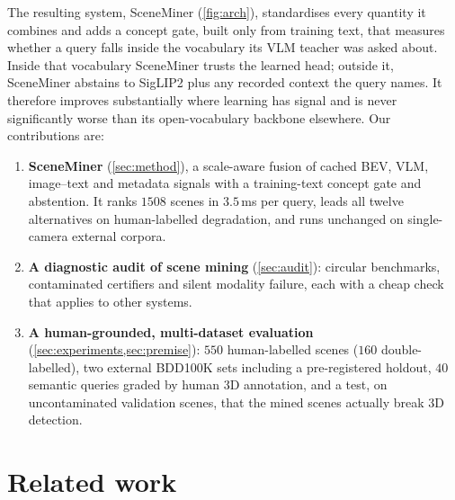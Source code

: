 \documentclass[10pt,twocolumn,letterpaper]{article}
\begin{document}
The resulting system, SceneMiner (\cref{fig:arch}), standardises every quantity it
combines and adds a concept gate, built only from training text, that measures
whether a query falls inside the vocabulary its VLM teacher was asked about. Inside
that vocabulary SceneMiner trusts the learned head; outside it, SceneMiner abstains
to SigLIP2 plus any recorded context the query names. It therefore improves
substantially where learning has signal and is never significantly worse than its
open-vocabulary backbone elsewhere. Our contributions are:
\begin{enumerate}\setlength{\itemsep}{1pt}
\item \textbf{SceneMiner} (\cref{sec:method}), a scale-aware fusion of cached BEV,
  VLM, image--text and metadata signals with a training-text concept gate and
  abstention. It ranks $1508$ scenes in $3.5$\,ms per query, leads all twelve
  alternatives on human-labelled degradation, and runs unchanged on single-camera
  external corpora.
\item \textbf{A diagnostic audit of scene mining} (\cref{sec:audit}): circular
  benchmarks, contaminated certifiers and silent modality failure, each with a
  cheap check that applies to other systems.
\item \textbf{A human-grounded, multi-dataset evaluation}
  (\cref{sec:experiments,sec:premise}): $550$ human-labelled scenes ($160$
  double-labelled), two external BDD100K sets including a pre-registered holdout,
  $40$ semantic queries graded by human 3D annotation, and a test, on uncontaminated
  validation scenes, that the mined scenes actually break 3D detection.
\end{enumerate}


\section{Related work}
\end{document}
